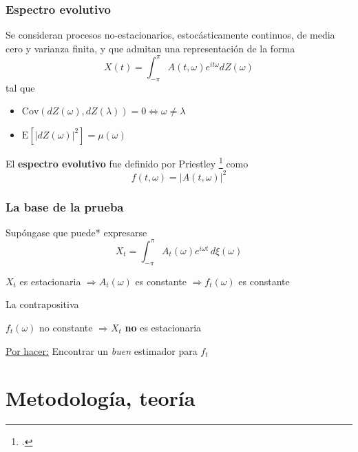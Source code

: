 \documentclass[11pt]{beamer}
\newcommand{\intPI}{\int_{-\pi}^{\pi}}
\newcommand{\E}[1]{\mathrm{E}\left[ #1 \right]}
\newcommand{\Cov}[1]{\mathrm{Cov}\left( #1 \right)}
\newcommand{\abso}[1]{\left| #1 \right|}
\begin{document}

\begin{frame}\frametitle{Espectro evolutivo}
Se consideran procesos no-estacionarios, estoc\'asticamente continuos, de media cero y varianza 
finita, y que admitan una representaci\'on de la forma
\begin{equation*}
X(t) = \intPI A(t,\omega) e^{i t \omega} dZ(\omega)
\end{equation*}
tal que 
\begin{itemize}
\item $\Cov{dZ(\omega),dZ(\lambda)} = 0 \Leftrightarrow \omega \neq \lambda$
\item $\E{\abso{dZ(\omega)}^{2}} = \mu(\omega)$
\end{itemize}

El \textbf{espectro evolutivo} fue definido por Priestley \footcite{Priestley65} como
\begin{equation*}
f(t,\omega) = \abso{A(t,\omega)}^{2}
\end{equation*}
\end{frame}


\begin{frame}\frametitle{La base de la prueba}
Sup\'ongase que puede* expresarse
\begin{equation*}
X_t = \int_{-\pi}^{\pi} A_t(\omega) e^{i\omega t} \, d\xi(\omega)
\end{equation*}

\pause
\begin{center}
$X_t$ es estacionaria $\Rightarrow A_t(\omega)$ es constante $\Rightarrow f_t(\omega)$ es constante
\end{center}

\pause
La contrapositiva
\begin{center}
$f_t(\omega)$ no constante $\Rightarrow X_t$ \textbf{no} es estacionaria
\end{center}

\underline{Por hacer:} Encontrar un \textit{buen} estimador para $f_t$
\end{frame}


\section{Metodolog\'ia, teor\'ia}
\end{document}
